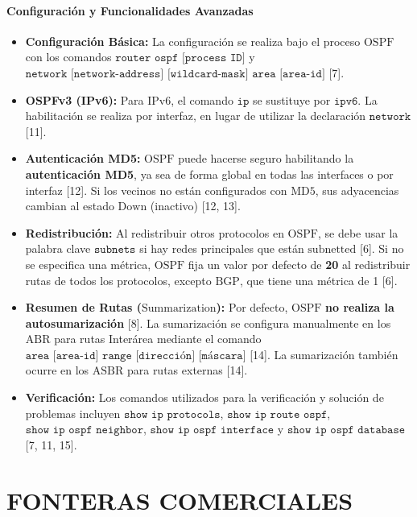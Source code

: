 \documentclass[a5paper]{book}%
\begin{document}
  \subsubsection*{Configuración y Funcionalidades Avanzadas}
  
  \begin{itemize}
  	\item \textbf{Configuración Básica:} La configuración se realiza bajo el proceso $\text{OSPF}$ con los comandos $\texttt{router ospf [process ID]}$ y $\texttt{network [network-address] [wildcard-mask] area [area-id]}$ [7].
  	\item \textbf{OSPFv3 (IPv6):} Para $\text{IPv6}$, el comando $\texttt{ip}$ se sustituye por $\texttt{ipv6}$. La habilitación se realiza por interfaz, en lugar de utilizar la declaración $\texttt{network}$ [11].
  	\item \textbf{Autenticación MD5:} $\text{OSPF}$ puede hacerse seguro habilitando la \textbf{autenticación MD5}, ya sea de forma global en todas las interfaces o por interfaz [12]. Si los vecinos no están configurados con $\text{MD5}$, sus adyacencias cambian al estado $\text{Down}$ (inactivo) [12, 13].
  	\item \textbf{Redistribución:} Al redistribuir otros protocolos en $\text{OSPF}$, se debe usar la palabra clave $\texttt{subnets}$ si hay redes principales que están $\text{subnetted}$ [6]. Si no se especifica una métrica, $\text{OSPF}$ fija un valor por defecto de \textbf{20} al redistribuir rutas de todos los protocolos, excepto $\text{BGP}$, que tiene una métrica de 1 [6].
  	\item \textbf{Resumen de Rutas ($\text{Summarization}$):} Por defecto, $\text{OSPF}$ \textbf{no realiza la autosumarización} [8]. La sumarización se configura manualmente en los $\text{ABR}$ para rutas Interárea mediante el comando $\texttt{area [area-id] range [dirección] [máscara]}$ [14]. La sumarización también ocurre en los $\text{ASBR}$ para rutas externas [14].
  	\item \textbf{Verificación:} Los comandos utilizados para la verificación y solución de problemas incluyen $\texttt{show ip protocols}$, $\texttt{show ip route ospf}$, $\texttt{show ip ospf neighbor}$, $\texttt{show ip ospf interface}$ y $\texttt{show ip ospf database}$ [7, 11, 15].
  \end{itemize}
  
  
\chapter{FONTERAS COMERCIALES}  
\end{document}
